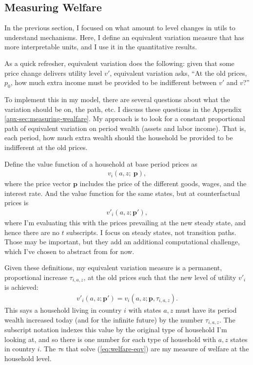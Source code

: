 \documentclass[12pt,pdftex]{article}
\begin{document}
\begin{onehalfspacing}
\subsection{Measuring Welfare}

In the previous section, I focused on what amount to level changes in utils to understand mechanisms. Here, I define an equivalent variation measure that has more interpretable units, and I use it in the quantitative results.

As a quick refresher, equivalent variation does the following: given that some price change delivers utility level $v'$, equivalent variation asks, ``At the old prices, $p_0$, how much extra income must be provided to be indifferent between $v'$ and $v$?''

To implement this in my model, there are several questions about what the variation should be on, the path, etc. I discuss these questions in the Appendix \ref{apx-sec:measuring-wealfare}. My approach is to look for a constant proportional path of equivalent variation on period wealth (assets and labor income). That is, each period, how much extra wealth should the household be provided to be indifferent at the old prices.

Define the value function of a household at base period prices as
\begin{align}
v_i(a, z ; \ \mathbf{p}),
\end{align}
where the price vector $\mathbf{p}$ includes the price of the different goods, wages, and the interest rate. And the value function for the same states, but at counterfactual prices is
\begin{align}
v'_i(a, z ; \mathbf{p'}), \label{eq:welfare-eqv-cftc}
\end{align}
where I'm evaluating this with the prices prevailing at the new steady state, and hence there are no $t$ subscripts. I focus on steady states, not transition paths. Those may be important, but they add an additional computational challenge, which I've chosen to abstract from for now.

Given these definitions, my equivalent variation measure is a permanent, proportional increase $\tau_{i,a,z}$, at the old prices such that the new level of utility $v'_i$ is achieved:
\begin{align}
v'_i(a,z ; \mathbf{p'}) = v_i(a,z ; \mathbf{p}, \tau_{i, a,z}). \label{eq:welfare-eqv}
\end{align}
This says a household living in country $i$ with states $a,z$ must have its period wealth increased today (and for the infinite future) by the number $\tau_{i,a,z}$. The subscript notation indexes this value by the original type of household I'm looking at, and so there is one number for each type of household with $a,z$ states in country $i$. The $\tau$s that solve (\ref{eq:welfare-eqv}) are my measure of welfare at the household level.


\end{onehalfspacing}
\end{document}
